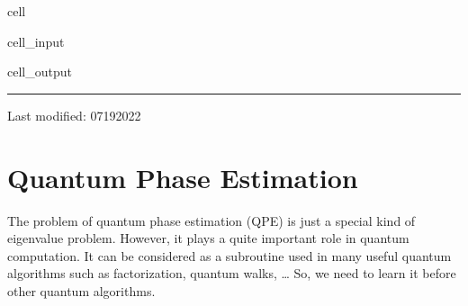 \documentclass[letterpaper,10pt,english]{jupyterBook}
\begin{document}
\begin{sphinxuseclass}{cell}
\begin{sphinxVerbatimInput}
\begin{sphinxuseclass}{cell_input}
\begin{sphinxVerbatim}[commandchars=\\\{\}]
\end{sphinxVerbatim}

\end{sphinxuseclass}\end{sphinxVerbatimInput}
\begin{sphinxVerbatimOutput}

\begin{sphinxuseclass}{cell_output}
\noindent{}

\end{sphinxuseclass}\end{sphinxVerbatimOutput}

\end{sphinxuseclass}

\bigskip\hrule\bigskip


\sphinxAtStartPar
Last modified: 07\sphinxhyphen{}19\sphinxhyphen{}2022

\sphinxstepscope


\section{Quantum Phase Estimation}
\label{\detokenize{algorithms/qpe:quantum-phase-estimation}}\label{\detokenize{algorithms/qpe:sec-qpe}}\label{\detokenize{algorithms/qpe::doc}}
\sphinxAtStartPar
The problem of quantum phase estimation (QPE) is just a special kind of eigenvalue problem.  However, it plays a quite important role in quantum computation.  It can be considered as a subroutine used in many useful quantum algorithms such as factorization, quantum walks, … So, we need to learn it before other quantum algorithms.
\end{document}

